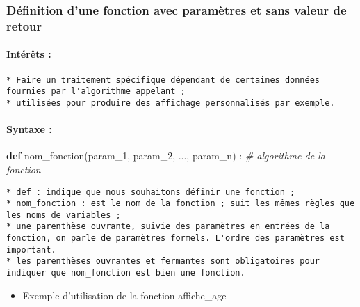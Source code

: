 \documentclass[11pt]{article}
\providecommand{\tightlist}{%
      \setlength{\itemsep}{0pt}\setlength{\parskip}{0pt}}
\newenvironment{Shaded}{}{}
\newcommand{\KeywordTok}[1]{\textcolor[rgb]{0.00,0.44,0.13}{\textbf{{#1}}}}
\newcommand{\CommentTok}[1]{\textcolor[rgb]{0.38,0.63,0.69}{\textit{{#1}}}}
\newcommand{\NormalTok}[1]{{#1}}
\begin{document}
    \subsubsection{Définition d'une fonction avec paramètres et sans valeur
de
retour}\label{duxe9finition-dune-fonction-avec-paramuxe8tres-et-sans-valeur-de-retour}

    \paragraph{Intérêts :}\label{intuxe9ruxeats}

\begin{verbatim}
* Faire un traitement spécifique dépendant de certaines données fournies par l'algorithme appelant ;
* utilisées pour produire des affichage personnalisés par exemple.
\end{verbatim}

    \paragraph{Syntaxe :}\label{syntaxe}

\begin{Shaded}
\begin{Highlighting}[]
    \KeywordTok{def}\NormalTok{ nom_fonction(param_1, param_2, ..., param_n) :}
        \CommentTok{# algorithme de la fonction}
\end{Highlighting}
\end{Shaded}

\begin{verbatim}
* def : indique que nous souhaitons définir une fonction ;
* nom_fonction : est le nom de la fonction ; suit les mêmes règles que les noms de variables ;
* une parenthèse ouvrante, suivie des paramètres en entrées de la fonction, on parle de paramètres formels. L'ordre des paramètres est important.
* les parenthèses ouvrantes et fermantes sont obligatoires pour indiquer que nom_fonction est bien une fonction.
\end{verbatim}

    \begin{itemize}
\tightlist
\item
  Exemple d'utilisation de la fonction affiche\_age
\end{itemize}
\end{document}
